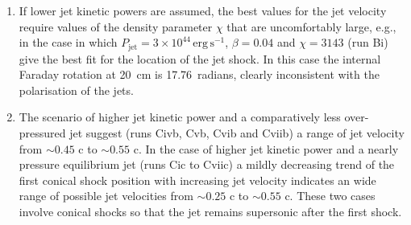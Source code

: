 \begin{enumerate}
\item If lower jet kinetic powers are assumed, the best values for the jet velocity require values of the density parameter $\chi$ that are uncomfortably large, e.g., in the case in which $P_\mathrm{jet}=3\times10^{44}\,\mathrm{erg}\,\mathrm{s}^{-1}$, $\beta=0.04$ and $\chi=3143$ (run Bi) give the best fit for the location of the jet shock. In this case the internal Faraday rotation at 20~cm is 17.76~radians, clearly inconsistent with the polarisation of the jets.

\item The scenario of higher jet kinetic power and a comparatively less over-pressured jet suggest (runs Civb, Cvb, Cvib and Cviib) a range of jet velocity from $\sim0.45$ c to $\sim0.55$ c. In the case of higher jet kinetic power and a nearly pressure equilibrium jet (runs Cic to Cviic) a mildly decreasing trend of the first conical shock position with increasing jet velocity indicates an wide range of possible jet velocities from $\sim0.25$ c to $\sim0.55$ c. These two cases involve conical shocks so that the jet remains supersonic after the first shock. 


%
%
\end{enumerate}

